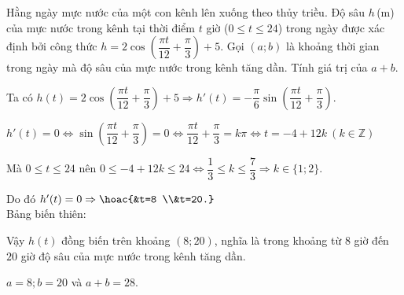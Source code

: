 \begin{ex}%
Hằng ngày mực nước của một con kênh lên xuống theo thủy triều. Độ sâu $h$\,(m) của mực nước trong kênh tại thời điểm $t$ giờ ($0 \leq t \leq 24$) trong ngày được xác định bởi công thức $h=2 \cos \left(\dfrac{\pi t}{12}+\dfrac{\pi}{3}\right)+5$. Gọi $(a; b)$ là khoảng thời gian trong ngày mà độ sâu của mực nước trong kênh tăng dần. Tính giá trị của $a+b$.
\loigiai
{Ta có $h(t)=2 \cos \left(\dfrac{\pi t}{12}+\dfrac{\pi}{3}\right)+5 \Rightarrow h'(t)=-\dfrac{\pi}{6} \sin \left(\dfrac{\pi t}{12}+\dfrac{\pi}{3}\right)$.

$h'(t)=0 \Leftrightarrow \sin \left(\dfrac{\pi t}{12}+\dfrac{\pi}{3}\right)=0 \Leftrightarrow \dfrac{\pi t}{12}+\dfrac{\pi}{3}=k \pi \Leftrightarrow t=-4+12 k \ (k \in \mathbb{Z})$

Mà $0 \leq t \leq 24$ nên $0 \leq-4+12k \leq 24 \Leftrightarrow \dfrac{1}{3} \leq k \leq \dfrac{7}{3} \Rightarrow k \in\{1; 2\}$.

Do đó $h'(t)=0 \Rightarrow \hoac{&t=8 \\&t=20.}$\\
Bảng biến thiên:
\begin{center}
\end{center}
Vậy $h(t)$ đồng biến trên khoảng $(8; 20)$, nghĩa là trong khoảng từ $8$ giờ đến $20$ giờ độ sâu của mực nước trong kênh tăng dần.

$a=8; b=20$ và $a+b=28$.
}
\end{ex}

